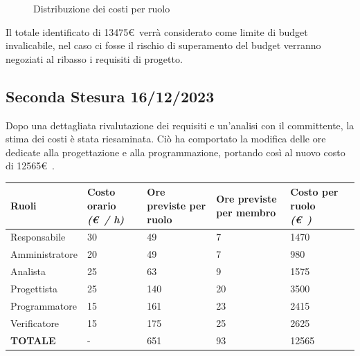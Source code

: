 \documentclass{article}
\begin{document}
    \begin{figure}[h]
        \centering
        \caption{Distribuzione dei costi per ruolo}
    \end{figure}
    
    Il totale identificato di 13475\euro\ verrà considerato come limite di budget invalicabile,
    nel caso ci fosse il rischio di superamento del budget verranno negoziati al ribasso i requisiti
    di progetto.
\subsection{Seconda Stesura 16/12/2023}
Dopo una dettagliata rivalutazione dei requisiti e un'analisi con il committente, la stima dei costi è stata riesaminata. Ciò ha comportato la modifica delle ore dedicate alla progettazione e alla programmazione, portando così al nuovo costo di 12565\euro\ .
\begin{center}
        
    \begin{tabular}{|C{3cm}|C{2cm}|C{2cm}|C{2cm}|C{2cm}|C{2cm}|}
        \hline

        \textbf{Ruoli} & \textbf{Costo orario} \linebreak \textit{(\euro\ / h)} & \textbf{Ore previste per ruolo} & \textbf{Ore previste per membro} & \textbf{Costo per ruolo} \linebreak \textit{(\euro\ )} \\
        \hline\hline
        
        Responsabile & 30 & 49 & 7 & 1470 \\
        \hline
        
        Amministratore & 20 & 49 & 7 & 980 \\
        \hline
        
        Analista & 25 & 63 & 9 & 1575 \\
        \hline 
        
        Progettista & 25 & 140 & 20 & 3500 \\ 
        \hline
        
        Programmatore & 15 & 161 & 23 & 2415 \\
        \hline
        
        Verificatore & 15 & 175 & 25 & 2625 \\
        \hline\hline
        
        \textbf{TOTALE} & - & 651 & 93 & 12565 \\
        \hline
    \end{tabular}
    \end{center}
\end{document}

